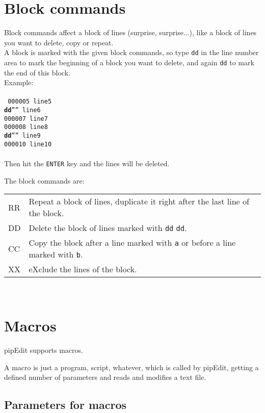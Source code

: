 \documentclass{report}
\begin{document}
\chapter{Block commands}

Block commands affect a block of lines (surprise, surprise...), like a block
of lines you want to delete, copy or repeat. \\

A block is marked with the given block commands, so type  \texttt{dd} in the
line number area to mark the beginning of a block you want to delete, and
again \texttt{dd} to mark the end of this block. \\

Example: \\ \\
\texttt{
000005 line5 \\
\textbf{dd}'''' line6 \\
000007 line7 \\
000008 line8 \\
\textbf{dd}'''' line9 \\
000010 line10 \\
} \\
\break
Then hit the \texttt{ENTER} key and the lines will be deleted.

\break
The block commands are: \\

\begin{tabular}{l l}
RR & Repeat a block of lines, duplicate it right after the last line of the block. \\
DD & Delete the block of lines marked with \texttt{dd}  \texttt{dd}. \\
CC & Copy the block after a line marked with \texttt{a} or before a line marked
     with \texttt{b}. \\
XX & eXclude the lines of the block. \\
\end{tabular} \\


\chapter{Macros}

pipEdit supports macros.

A macro is just a program, script, whatever, which is called by pipEdit, 
getting a defined number of parameters and reads and modifies a text file.

\section{Parameters for macros}
\end{document}
